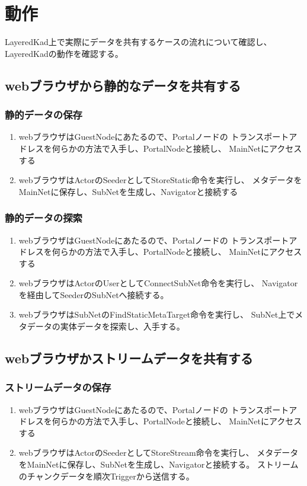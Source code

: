 \documentclass[sotsuron]{jcsie}
\begin{document}
\section{動作}
LayeredKad上で実際にデータを共有するケースの流れについて確認し、
LayeredKadの動作を確認する。

\subsection{webブラウザから静的なデータを共有する}
\subsubsection{静的データの保存}
\begin{enumerate}
	\item 
	webブラウザはGuestNodeにあたるので、Portalノードの
	トランスポートアドレスを何らかの方法で入手し、PortalNodeと接続し、
	MainNetにアクセスする
	\\
	\item
	webブラウザはActorのSeederとしてStoreStatic命令を実行し、
	メタデータをMainNetに保存し、SubNetを生成し、Navigatorと接続する	
\end{enumerate}
\subsubsection{静的データの探索}
\begin{enumerate}
	\item 
	webブラウザはGuestNodeにあたるので、Portalノードの
	トランスポートアドレスを何らかの方法で入手し、PortalNodeと接続し、
	MainNetにアクセスする
	\\
	\item
	webブラウザはActorのUserとしてConnectSubNet命令を実行し、
	Navigatorを経由してSeederのSubNetへ接続する。
	\\
	\item 
	webブラウザはSubNetのFindStaticMetaTarget命令を実行し、
	SubNet上でメタデータの実体データを探索し、入手する。
\end{enumerate}

\subsection{webブラウザかストリームデータを共有する}
\subsubsection{ストリームデータの保存}
\begin{enumerate}
	\item 
	webブラウザはGuestNodeにあたるので、Portalノードの
	トランスポートアドレスを何らかの方法で入手し、PortalNodeと接続し、
	MainNetにアクセスする
	\\
	\item
	webブラウザはActorのSeederとしてStoreStream命令を実行し、
	メタデータをMainNetに保存し、SubNetを生成し、Navigatorと接続する。
	ストリームのチャンクデータを順次Triggerから送信する。	
\end{enumerate}
\end{document}
